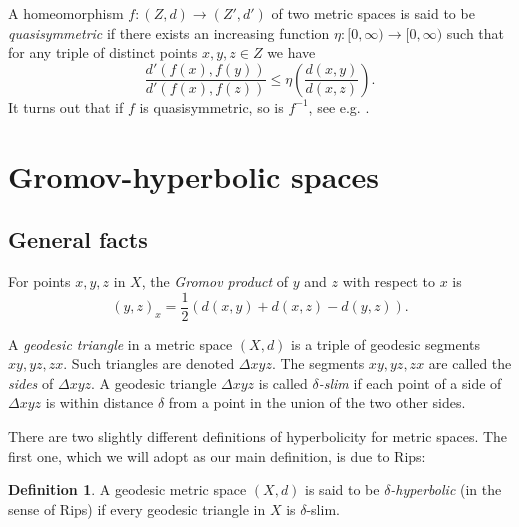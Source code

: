 \documentclass[12pt]{amsbook}%
\theoremstyle{definition}
\newtheorem{defi}[thm]{Definition}
\theoremstyle{remark}
\numberwithin{section}{chapter}
\numberwithin{subsection}{section}
\numberwithin{figure}{chapter}
\begin{document}


A homeomorphism $f: (Z,d)\to (Z',d')$ of two metric spaces is said to be {\em quasisymmetric}  if there exists 
an increasing function $\eta: [0,\infty)\to [0,\infty)$ such that for any triple of distinct points $x, y, z\in Z$ we have
$$
\frac{d'(f(x), f(y))}{d'(f(x), f(z))} \le \eta \left( \frac{d(x, y)}{d(x, z)}\right). 
$$
It turns out that if $f$ is quasisymmetric, so is $f^{-1}$, see e.g. \cite[Lemma 5.2.13]{Buyalo-Schroeder}. 





\section{Gromov-hyperbolic spaces}\label{sec:Gromov-hyperbolic spaces}

\subsection{General facts}

For points  $x,y,z$ in $X$, the {\em Gromov product} of $y$ and $z$ with respect to $x$ is  
\[(y,z)_x=\frac{1}{2}\left(d(x,y)+d(x,z)-d(y,z)\right).\]

A {\em geodesic triangle} in a metric space $(X,d)$ is a triple of geodesic segments $xy, yz, zx$. Such triangles are denoted $\Delta xyz$. 
The segments $xy, yz, zx$ are called the {\em sides} of  $\Delta xyz$. A geodesic triangle $\Delta xyz$ is called {\em $\delta$-slim} if each point of a side of $\Delta xyz$ is within distance $\delta$ from a point in the union of the two other sides.  

There are two slightly different definitions of hyperbolicity for metric spaces. The first one, which we will adopt as our main definition, is due to Rips:

\begin{defi} 
A geodesic metric space $(X,d)$ is said to be {\em $\delta$-hyperbolic} (in the sense of Rips) if every geodesic triangle in $X$ is $\delta$-slim. 
\end{defi}
\end{document}
